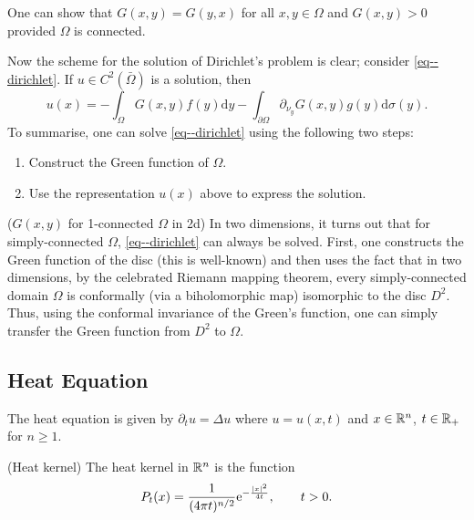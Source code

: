 \documentclass[11pt]{article}
\begin{document}
				\begin{remark}
					One can show that $G(x,y)=G(y,x)$ for all $x,y\in\Omega$ and $G(x,y)>0$ provided $\Omega$ is connected.
				\end{remark}
				 Now the scheme for the solution of Dirichlet's problem is clear; consider \eqref{eq--dirichlet}. If $u\in C^2(\bar{\Omega})$ is a solution, then
					\begin{equation*}
						u(x)=-\int_\Omega G(x,y)f(y)\mathrm{d}y-\int_{\partial\Omega}\partial_{\nu_y} G(x,y) g(y)\mathrm{d}\sigma(y).
					\end{equation*}
					To summarise, one can solve \eqref{eq--dirichlet} using the following two steps:
					\begin{enumerate}
						\item Construct the Green function of $\Omega$.
						\item Use the representation $u(x)$ above to express the solution.
					\end{enumerate}


				\begin{remark}($G(x,y)$ for 1-connected $\Omega$ in 2d)
					In two dimensions, it turns out that for simply-connected $\Omega$, \eqref{eq--dirichlet} can always be solved. First, one constructs the Green function of the disc (this is well-known) and then uses the fact that in two dimensions, by the celebrated Riemann mapping theorem,  every simply-connected domain $\Omega$ is conformally (via a biholomorphic map) isomorphic to the disc $D^2$. Thus, using the conformal invariance of the Green's function, one can simply transfer the Green function from $D^2$ to $\Omega$. 
				\end{remark}


		\subsection{Heat Equation}

			The heat equation is given by $\partial_t u=\Delta u$ where $u=u(x,t)$ and $x\in\mathbb{R}^n$, $t\in\mathbb{R}_+$ for $n\ge1$.

			\begin{defi}
				(Heat kernel) The heat kernel in $\mathbb{R}^n$ is the function
				\begin{equation*}\label{eq--heatkernel}
					P_t(x)=\frac{1}{(4\pi t)^{n/2}}\mathrm{e}^{-\frac{|x|^2}{4 t}},\qquad t>0.
				\end{equation*}
			\end{defi}
\end{document}
